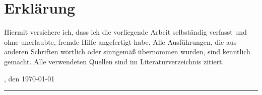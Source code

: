 \chapter*{Erklärung}

Hiermit versichere ich, dass ich die vorliegende Arbeit selbständig verfasst und ohne unerlaubte, fremde Hilfe angefertigt habe. Alle Ausführungen, die aus anderen Schriften wörtlich oder sinngemäß übernommen wurden, sind kenntlich gemacht. Alle verwendeten Quellen sind im Literaturverzeichnis zitiert.

\Wohnort, den \today
\newline

\rule[-0.2cm]{5cm}{0.5pt}

\textsc{\Name} 
\cleardoublepage